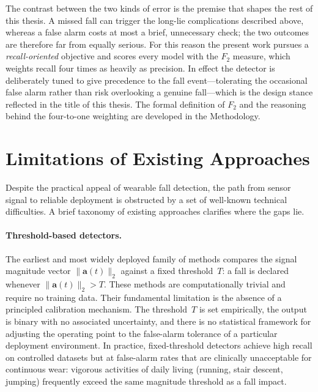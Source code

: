 The contrast between the two kinds of error is the premise that shapes the rest of
this thesis. A missed fall can trigger the long-lie complications described above,
whereas a false alarm costs at most a brief, unnecessary check; the two outcomes are
therefore far from equally serious. For this reason the present work pursues a
\emph{recall-oriented} objective and scores every model with the $F_2$ measure, which
weights recall four times as heavily as precision. In effect the detector is
deliberately tuned to give precedence to the fall event---tolerating the occasional
false alarm rather than risk overlooking a genuine fall---which is the design stance
reflected in the title of this thesis. The formal definition of $F_2$ and the reasoning
behind the four-to-one weighting are developed in the Methodology.

\section{Limitations of Existing Approaches}
\label{subsec:limitations-related}

Despite the practical appeal of wearable fall detection, the path from sensor signal
to reliable deployment is obstructed by a set of well-known technical difficulties.
A brief taxonomy of existing approaches clarifies where the gaps lie.

\paragraph{Threshold-based detectors.}
The earliest and most widely deployed family of methods compares the signal magnitude
vector $\|\mathbf{a}(t)\|_2$ against a fixed threshold~$T$: a fall is declared
whenever $\|\mathbf{a}(t)\|_2 > T$.  These methods are computationally trivial and
require no training data.  Their fundamental limitation is the absence of a principled
calibration mechanism.  The threshold~$T$ is set empirically, the output is binary
with no associated uncertainty, and there is no statistical framework for adjusting
the operating point to the false-alarm tolerance of a particular deployment environment.
In practice, fixed-threshold detectors achieve high recall on controlled datasets but
at false-alarm rates that are clinically unacceptable for continuous wear: vigorous
activities of daily living (running, stair descent, jumping) frequently exceed the
same magnitude threshold as a fall impact.

